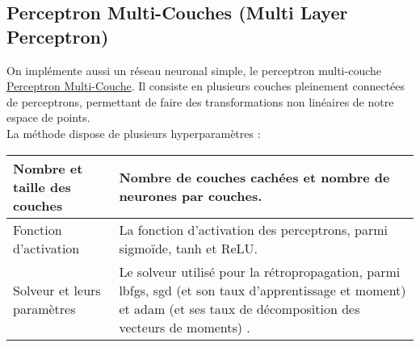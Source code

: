 \subsection{Perceptron Multi-Couches (Multi Layer Perceptron)}

On implémente aussi un réseau neuronal simple, le perceptron multi-couche \href{https://scikit-learn.org/stable/modules/generated/sklearn.neural_network.MLPClassifier.html}{Perceptron Multi-Couche}. Il consiste en plusieurs couches pleinement connectées de perceptrons, permettant de faire des transformations non linéaires de notre espace de points.\\

La méthode dispose de plusieurs hyperparamètres :

\noindent
\begin{tabularx}{\textwidth}{|X|X|}
    \hline
    Nombre et taille des couches  & Nombre de couches cachées et nombre de neurones par couches.\\\hline
    Fonction d'activation & La fonction d'activation des perceptrons, parmi sigmoïde, tanh et ReLU. \\\hline
    Solveur et leurs paramètres & Le solveur utilisé pour la rétropropagation, parmi lbfgs, sgd (et son taux d'apprentissage et moment) et adam (et ses taux de décomposition des vecteurs de moments) . \\\hline
\end{tabularx}